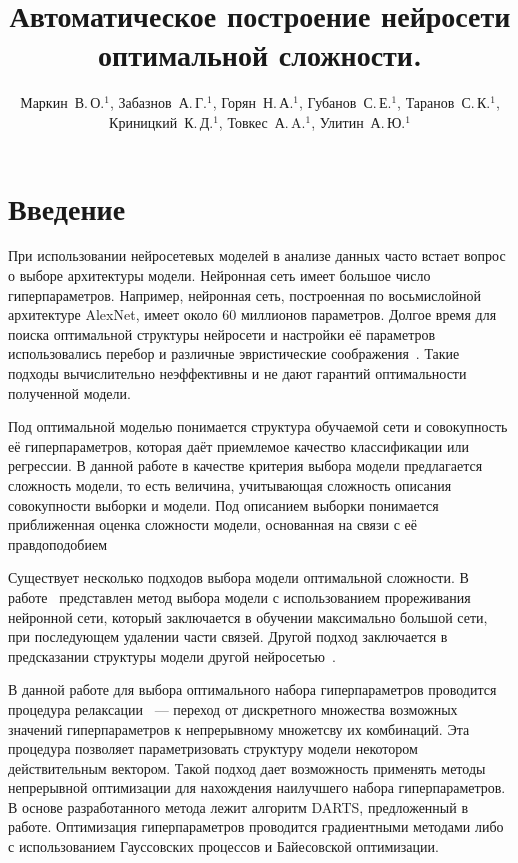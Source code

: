 \documentclass[12pt,twoside]{article}
\title
    [Автоматическое построение нейросети оптимальной сложности ] %
    {Автоматическое построение нейросети оптимальной сложности. }
\author
    {
    	Маркин~В.\,О.$^1$, 
    	Забазнов~А.\,Г.$^1$, 
    	Горян~Н.\,А.$^1$, 
    	Губанов~С.\,Е.$^1$, 
    	Таранов~С.\,К.$^1$,
    	Криницкий~К.\,Д.$^1$, 
    	Товкес~А.\,A.$^1$,
	    Улитин~А.\,Ю.$^1$
	} %
\begin{document}
\maketitle


\section{Введение}
При использовании нейросетевых моделей в анализе данных часто встает вопрос о выборе архитектуры модели. Нейронная сеть имеет большое число гиперпараметров. Например, нейронная сеть, построенная по восьмислойной архитектуре AlexNet, имеет около 60 миллионов параметров. Долгое время для поиска оптимальной структуры нейросети и настройки её параметров использовались перебор и различные эвристические соображения~\cite{DBLP:conf/emnlp/Kim14}. Такие подходы вычислительно неэффективны и не дают гарантий оптимальности полученной модели.

Под оптимальной моделью понимается структура обучаемой сети и совокупность её гиперпараметров, которая даёт приемлемое качество классификации или регрессии. В данной работе в качестве критерия выбора модели предлагается сложность модели, то есть величина, учитывающая сложность описания совокупности выборки и модели. Под описанием выборки понимается приближенная оценка сложности модели, основанная на связи с её правдоподобием\cite{DescriptionLength}

Существует несколько подходов выбора модели оптимальной сложности. В работе~\cite{Cun:1990:OBD:109230.109298} представлен метод выбора модели с использованием прореживания нейронной сети, который заключается в обучении максимально большой сети, при последующем удалении части связей. Другой подход заключается в предсказании структуры модели другой нейросетью~\cite{Sutskever:2014:SSL:2969033.2969173}.

В данной работе для выбора оптимального набора гиперпараметров проводится процедура релаксации~\cite{Liu2018DARTSDA} --- переход от дискретного множества возможных значений гиперпараметров к непрерывному множетсву их комбинаций. Эта процедура позволяет параметризовать структуру модели некотором действительным вектором.
Такой подход дает возможность применять методы непрерывной оптимизации для нахождения наилучшего набора гиперпараметров. В основе разработанного метода лежит алгоритм DARTS, предложенный в работе\cite{DARTS}.
Оптимизация гиперпараметров проводится градиентными методами \cite{pmlr-v37-maclaurin15, pmlr-v70-franceschi17a, Pedregosa} либо с использованием Гауссовских процессов и Байесовской оптимизации.
\end{document}
